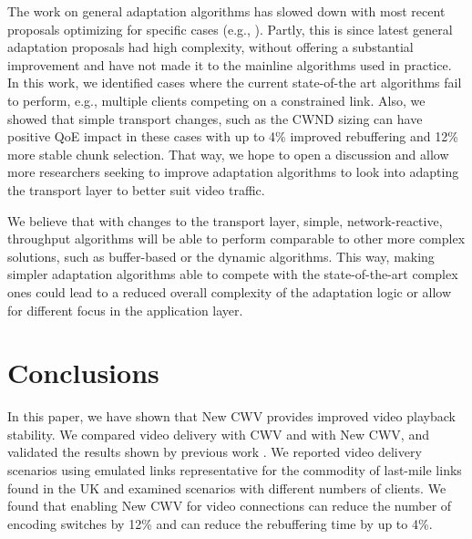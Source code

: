 \documentclass[10pt,sigconf,anonymous]{acmart}
\begin{document}

The work on general adaptation algorithms has slowed down with most recent proposals optimizing for specific cases (e.g., \cite{Karagkioules-2020-achieving-low-latency}). Partly, this is since latest general adaptation proposals had high complexity, without offering a substantial improvement \cite{Yin-2015-a-control-theoritic-approach} and have not made it to the mainline algorithms used in practice. In this work, we identified cases where the current state-of-the art algorithms fail to perform, e.g., multiple clients competing on a constrained link. Also, we showed that simple transport changes, such as the CWND sizing can have positive QoE impact in these cases with up to 4\% improved rebuffering and 12\% more stable chunk selection. That way, we hope to open a discussion and allow more researchers seeking to improve adaptation algorithms to look into adapting the transport layer to better suit video traffic.

We believe that with changes to the transport layer, simple, network-reactive, throughput algorithms will be able to perform comparable to other more complex solutions, such as buffer-based or the dynamic algorithms. This way, making simpler adaptation algorithms able to compete with the state-of-the-art complex ones could lead to a reduced overall complexity of the adaptation logic or allow for different focus in the application layer.

\section{Conclusions}
\label{sec:conclusion}

In this paper, we have shown that New CWV provides improved video playback stability. We compared video delivery with CWV and with New CWV, and validated the results shown by previous work \cite{Nazir-2014-performance-evaluation-congestion-window-validation-dash-newcwv}. We reported video delivery scenarios using emulated links representative for the commodity of last-mile links found in the UK and examined scenarios with different numbers of clients. We found that enabling New CWV for video connections can reduce the number of encoding switches by 12\% and can reduce the rebuffering time by up to 4\%.
\end{document}
